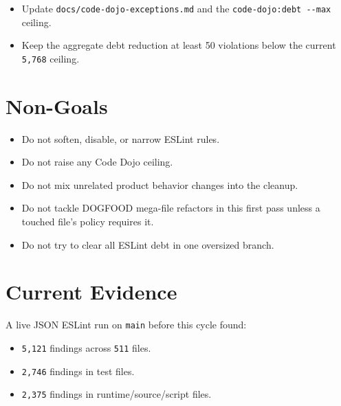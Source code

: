 \begin{itemize}
\item
  Update \texttt{d\allowbreak{}o\allowbreak{}c\allowbreak{}s\allowbreak{}/\allowbreak{}c\allowbreak{}o\allowbreak{}d\allowbreak{}e\allowbreak{}-\allowbreak{}d\allowbreak{}o\allowbreak{}j\allowbreak{}o\allowbreak{}-\allowbreak{}e\allowbreak{}x\allowbreak{}c\allowbreak{}e\allowbreak{}p\allowbreak{}t\allowbreak{}i\allowbreak{}o\allowbreak{}n\allowbreak{}s\allowbreak{}.\allowbreak{}m\allowbreak{}d} and the \texttt{c\allowbreak{}o\allowbreak{}d\allowbreak{}e\allowbreak{}-\allowbreak{}d\allowbreak{}o\allowbreak{}j\allowbreak{}o\allowbreak{}:\allowbreak{}d\allowbreak{}e\allowbreak{}b\allowbreak{}t\allowbreak{} \allowbreak{}-\allowbreak{}-\allowbreak{}m\allowbreak{}a\allowbreak{}x} ceiling.
\item
  Keep the aggregate debt reduction at least 50 violations below the current \texttt{5\allowbreak{},\allowbreak{}7\allowbreak{}6\allowbreak{}8} ceiling.
\end{itemize}

\section{Non-Goals}\label{record-216-non-goals}

\begin{itemize}
\tightlist
\item
  Do not soften, disable, or narrow ESLint rules.
\item
  Do not raise any Code Dojo ceiling.
\item
  Do not mix unrelated product behavior changes into the cleanup.
\item
  Do not tackle DOGFOOD mega-file refactors in this first pass unless a touched file's policy requires it.
\item
  Do not try to clear all ESLint debt in one oversized branch.
\end{itemize}

\section{Current Evidence}\label{record-216-current-evidence}

A live JSON ESLint run on \texttt{m\allowbreak{}a\allowbreak{}i\allowbreak{}n} before this cycle found:

\begin{itemize}
\tightlist
\item
  \texttt{5\allowbreak{},\allowbreak{}1\allowbreak{}2\allowbreak{}1} findings across \texttt{5\allowbreak{}1\allowbreak{}1} files.
\item
  \texttt{2\allowbreak{},\allowbreak{}7\allowbreak{}4\allowbreak{}6} findings in test files.
\item
  \texttt{2\allowbreak{},\allowbreak{}3\allowbreak{}7\allowbreak{}5} findings in runtime/source/script files.
\end{itemize}


